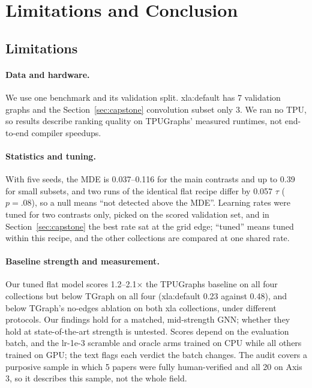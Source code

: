 \section{Limitations and Conclusion}
\label{sec:conclusion}

\subsection{Limitations}
\label{sec:limitations}
\paragraph{Data and hardware.} We use one benchmark and its validation split. xla:default has 7
validation graphs and the Section~\ref{sec:capstone} convolution subset only 3. We ran no TPU, so
results describe ranking quality on TPUGraphs' measured runtimes, not end-to-end compiler speedups.

\paragraph{Statistics and tuning.} With five seeds, the MDE is 0.037--0.116 for the main contrasts and
up to 0.39 for small subsets, and two runs of the identical flat recipe differ by 0.057 $\tau$
($p = .08$), so a null means ``not detected above the MDE''. Learning rates were tuned for two contrasts
only, picked on the scored validation set, and in Section~\ref{sec:capstone} the best rate sat at the
grid edge; ``tuned'' means tuned within this recipe, and the other collections are compared at one
shared rate.

\paragraph{Baseline strength and measurement.} Our tuned flat model scores 1.2--2.1$\times$ the
TPUGraphs baseline on all four collections but below TGraph on all four (xla:default 0.23 against 0.48),
and below TGraph's no-edges ablation on both xla collections, under different protocols. Our findings
hold for a matched, mid-strength GNN; whether they hold at state-of-the-art strength is untested. Scores
depend on the evaluation batch, and the lr-1e-3 scramble and oracle arms trained on CPU while all others
trained on GPU; the text flags each verdict the batch changes. The audit covers a purposive sample in
which 5 papers were fully human-verified and all 20 on Axis 3, so it describes this sample, not the
whole field.

